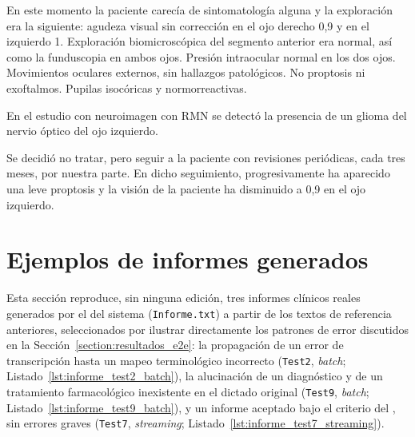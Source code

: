 En este momento la paciente carecía de sintomatología alguna y la exploración era la siguiente:
agudeza visual sin corrección en el ojo derecho 0,9 y en el izquierdo 1. Exploración
biomicroscópica del segmento anterior era normal, así como la funduscopia en ambos ojos. Presión
intraocular normal en los dos ojos. Movimientos oculares externos, sin hallazgos patológicos. No
proptosis ni exoftalmos. Pupilas isocóricas y normorreactivas.

En el estudio con neuroimagen con RMN se detectó la presencia de un glioma del nervio óptico del
ojo izquierdo.

Se decidió no tratar, pero seguir a la paciente con revisiones periódicas, cada tres meses, por
nuestra parte. En dicho seguimiento, progresivamente ha aparecido una leve proptosis y la visión de
la paciente ha disminuido a 0,9 en el ojo izquierdo.

\section{Ejemplos de informes generados}\label{anexo:ejemplos_informes_generados}

Esta sección reproduce, sin ninguna edición, tres informes clínicos reales generados por el
 del sistema (\texttt{Informe.txt}) a partir de los textos de referencia
anteriores, seleccionados por ilustrar directamente los patrones de error discutidos en la
Sección~\ref{section:resultados_e2e}: la propagación de un error de transcripción hasta un mapeo
terminológico incorrecto (\texttt{Test2}, \textit{batch}; Listado~\ref{lst:informe_test2_batch}),
la alucinación de un diagnóstico y de un tratamiento farmacológico inexistente en el dictado
original (\texttt{Test9}, \textit{batch}; Listado~\ref{lst:informe_test9_batch}), y un informe
aceptado bajo el criterio del , sin errores graves
(\texttt{Test7}, \textit{streaming}; Listado~\ref{lst:informe_test7_streaming}).


